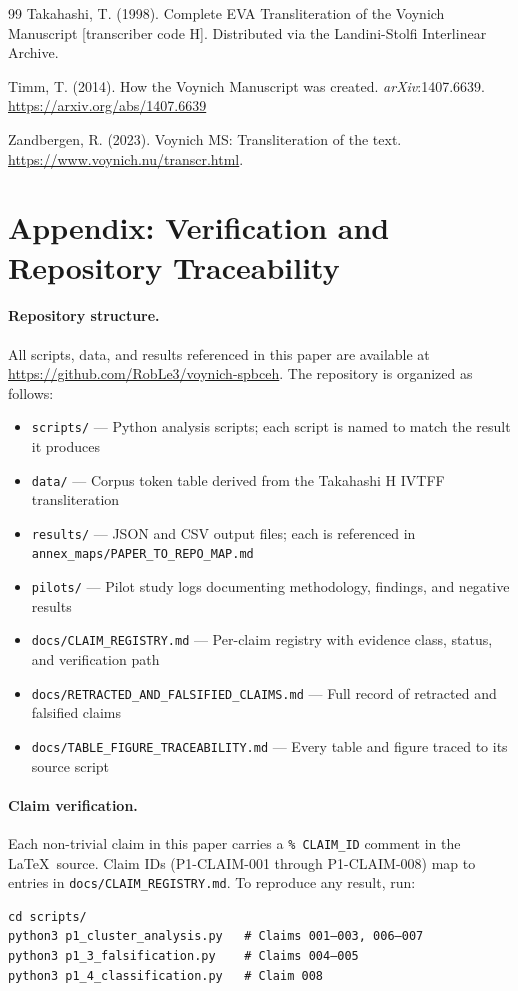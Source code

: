 \documentclass[11pt,a4paper,twocolumn]{article}
\begin{document}
\begin{thebibliography}{99}
 Takahashi, T. (1998). Complete EVA Transliteration of the Voynich Manuscript [transcriber code H]. Distributed via the Landini-Stolfi Interlinear Archive.

 Timm, T. (2014). How the Voynich Manuscript was created. \textit{arXiv}:1407.6639. \url{https://arxiv.org/abs/1407.6639}

 Zandbergen, R. (2023). Voynich MS: Transliteration of the text. \url{https://www.voynich.nu/transcr.html}.

\end{thebibliography}

\section*{Appendix: Verification and Repository Traceability}
\label{sec:appendix_verify}

\paragraph{Repository structure.}
All scripts, data, and results referenced in this paper are available at \url{https://github.com/RobLe3/voynich-spbceh}. The repository is organized as follows:
\begin{itemize}[noitemsep]
  \item \texttt{scripts/} — Python analysis scripts; each script is named to match the result it produces
  \item \texttt{data/} — Corpus token table derived from the Takahashi H IVTFF transliteration
  \item \texttt{results/} — JSON and CSV output files; each is referenced in \texttt{annex\_maps/PAPER\_TO\_REPO\_MAP.md}
  \item \texttt{pilots/} — Pilot study logs documenting methodology, findings, and negative results
  \item \texttt{docs/CLAIM\_REGISTRY.md} — Per-claim registry with evidence class, status, and verification path
  \item \texttt{docs/RETRACTED\_AND\_FALSIFIED\_CLAIMS.md} — Full record of retracted and falsified claims
  \item \texttt{docs/TABLE\_FIGURE\_TRACEABILITY.md} — Every table and figure traced to its source script
\end{itemize}

\paragraph{Claim verification.}
Each non-trivial claim in this paper carries a \texttt{\% CLAIM\_ID} comment in the \LaTeX\ source. Claim IDs (P1-CLAIM-001 through P1-CLAIM-008) map to entries in \texttt{docs/CLAIM\_REGISTRY.md}. To reproduce any result, run:
\begin{verbatim}
cd scripts/
python3 p1_cluster_analysis.py   # Claims 001–003, 006–007
python3 p1_3_falsification.py    # Claims 004–005
python3 p1_4_classification.py   # Claim 008
\end{verbatim}
\end{document}
